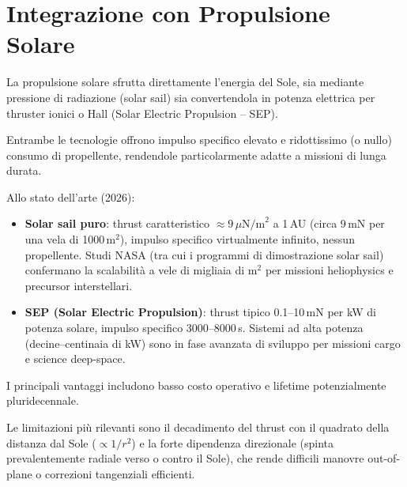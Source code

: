 \documentclass[11pt,a4paper]{article}
\theoremstyle{plain}
\theoremstyle{definition}
\begin{document}
\vspace{0.5cm}





\section{Integrazione con Propulsione Solare}

\vspace{0.2cm}

La propulsione solare sfrutta direttamente l’energia del Sole, sia mediante pressione di radiazione (solar sail) sia convertendola in potenza elettrica per thruster ionici o Hall (Solar Electric Propulsion – SEP). 


\vspace{0.2cm}


Entrambe le tecnologie offrono impulso specifico elevato e ridottissimo (o nullo) consumo di propellente, rendendole particolarmente adatte a missioni di lunga durata.

\vspace{0.2cm}

Allo stato dell’arte (2026):

\vspace{0.1cm}
\begin{itemize}
    \item \textbf{Solar sail puro}: thrust caratteristico $\approx 9\,\mu\text{N/m}^2$ a 1\,AU (circa 9\,mN per una vela di 1000\,m$^2$), impulso specifico virtualmente infinito, nessun propellente. Studi NASA (tra cui i programmi di dimostrazione solar sail) confermano la scalabilità a vele di migliaia di m$^2$ per missioni heliophysics e precursor interstellari.

    \vspace{0.1cm}
    \item \textbf{SEP (Solar Electric Propulsion)}: thrust tipico 0.1--10\,mN per kW di potenza solare, impulso specifico 3000--8000\,s. Sistemi ad alta potenza (decine--centinaia di kW) sono in fase avanzata di sviluppo per missioni cargo e science deep-space.
\end{itemize}

\vspace{0.2cm}

I principali vantaggi includono basso costo operativo e lifetime potenzialmente pluridecennale. 


\vspace{0.2cm}

Le limitazioni più rilevanti sono il decadimento del thrust con il quadrato della distanza dal Sole ($\propto 1/r^2$) e la forte dipendenza direzionale (spinta prevalentemente radiale verso o contro il Sole), che rende difficili manovre out-of-plane o correzioni tangenziali efficienti.
\end{document}
